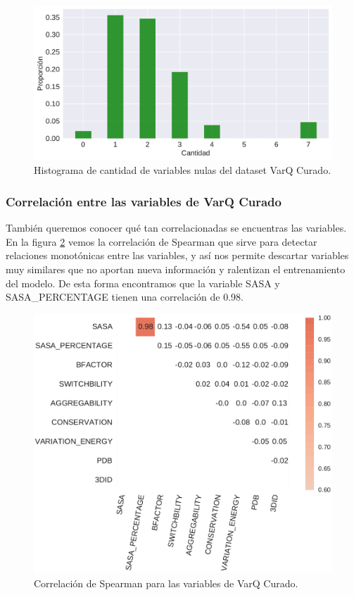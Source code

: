 \begin{figure}[H]
    \centering
    \includegraphics[scale=0.55]{documents/latex/figures/3/varq/nulos_varq.pdf}
    \caption{Histograma de cantidad de variables nulas del dataset VarQ Curado.}
    \label{fig:nulos_varq}
\end{figure}

\subsubsection{Correlación entre las variables de VarQ Curado}

También queremos conocer qué tan correlacionadas se encuentras las variables. En la figura \ref{fig:varq_corrplot} vemos la correlación de Spearman que sirve para detectar relaciones monotónicas entre las variables, y así nos permite descartar variables muy similares que no aportan nueva información y ralentizan el entrenamiento del modelo. De esta forma encontramos que la variable SASA y SASA\_PERCENTAGE tienen una correlación de 0.98.

\begin{figure}[H]
    \centering
    \includegraphics[scale=0.6]{documents/latex/figures/3/varq/varq_corrplot.pdf}
    \caption{Correlación de Spearman para las variables de VarQ Curado.}
    \label{fig:varq_corrplot}
\end{figure}

